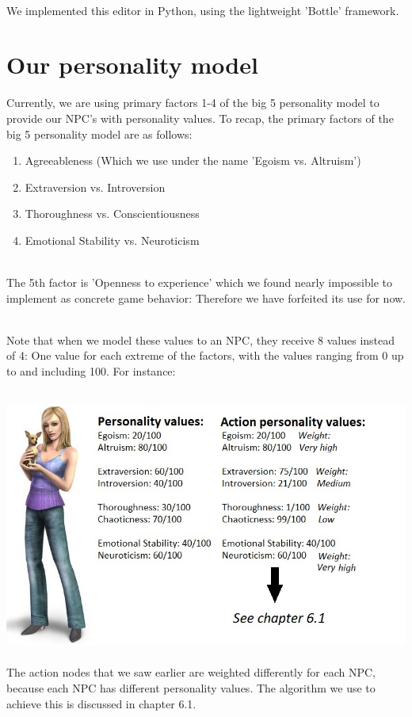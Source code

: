 \documentclass[11pt]{article} %
\begin{document}
~\\
We implemented this editor in Python, using the lightweight 'Bottle' framework.

\newpage
\section{Our personality model}
Currently, we are using primary factors 1-4 of the big 5 personality model to provide our NPC's with personality values. To recap, the primary factors of the big 5 personality model are as follows:

\begin{enumerate}
\item Agreeableness (Which we use under the name 'Egoism vs. Altruism')
\item Extraversion vs. Introversion
\item Thoroughness vs. Conscientiousness
\item Emotional Stability vs. Neuroticism
\end{enumerate}

~\\
The 5th factor is 'Openness to experience' which we found nearly impossible to implement as concrete game behavior: Therefore we have forfeited its use for now.

~\\
Note that when we model these values to an NPC, they receive 8 values instead of 4: One value for each extreme of the factors, with the values ranging from 0 up to and including 100.
For instance:

~\\
\includegraphics[scale=0.7]{sim}
~\\
The action nodes that we saw earlier are weighted differently for each NPC, because each NPC has different personality values. The algorithm we use to achieve this is discussed in chapter 6.1.
\end{document}
